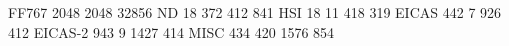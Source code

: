 FF767 2048 2048 32856
ND       18  372  412  841
HSI      18   11  418  319
EICAS   442    7  926  412
EICAS-2 943    9 1427  414
MISC    434  420 1576  854
